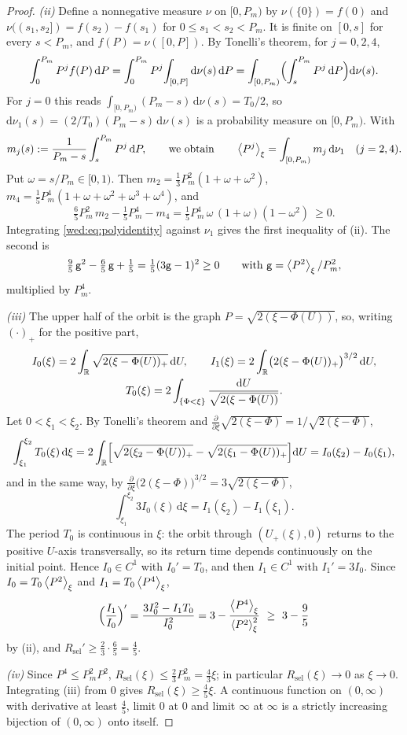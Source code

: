 \begin{proof}
\emph{(ii)} Define a nonnegative measure $\nu$ on $[0,P_m)$ by $\nu(\{0\})=f(0)$ and $\nu((s_1,s_2])=f(s_2)-f(s_1)$ for $0\le s_1<s_2<P_m$. It is finite on $[0,s]$ for every $s<P_m$, and $f(P)=\nu([0,P])$. By Tonelli's theorem, for $j=0,2,4$,
\[
\int_0^{P_m}P^jf(P)\,\mathrm dP=\int_0^{P_m}P^j\!\int_{[0,P]}\mathrm d\nu(s)\,\mathrm dP
=\int_{[0,P_m)}\Bigl(\int_s^{P_m}P^j\,\mathrm dP\Bigr)\mathrm d\nu(s).
\]
For $j=0$ this reads $\int_{[0,P_m)}(P_m-s)\,\mathrm d\nu(s)=T_0/2$, so $\mathrm d\nu_1(s)=(2/T_0)(P_m-s)\,\mathrm d\nu(s)$ is a probability measure on $[0,P_m)$. With
\[
m_j(s):=\frac1{P_m-s}\int_s^{P_m}P^j\,\mathrm dP,\qquad\text{we obtain}\qquad \left\langle P^j\right\rangle_\xi=\int_{[0,P_m)}m_j\,\mathrm d\nu_1\quad(j=2,4).
\]
Put $\omega=s/P_m\in[0,1)$. Then $m_2=\tfrac13P_m^2(1+\omega+\omega^2)$, $m_4=\tfrac15P_m^4(1+\omega+\omega^2+\omega^3+\omega^4)$, and
\begin{equation}\label{wed:eq:polyidentity}
\tfrac65P_m^2\,m_2-\tfrac15P_m^4-m_4=\tfrac15P_m^4\,\omega\,(1+\omega)(1-\omega^2)\ \ge0 .
\end{equation}
Integrating \eqref{wed:eq:polyidentity} against $\nu_1$ gives the first inequality of (ii). The second is
\[
\tfrac95\,\mathsf g^2-\tfrac65\,\mathsf g+\tfrac15=\tfrac15(3\mathsf g-1)^2\ge0\qquad\text{with }\mathsf g=\left\langle P^2\right\rangle_\xi/P_m^2 ,
\]
multiplied by $P_m^4$.

\emph{(iii)} The upper half of the orbit is the graph $P=\sqrt{2(\xi-\Phi(U))}$, so, writing $(\cdot)_+$ for the positive part,
\begin{gather*}
I_0(\xi)=2\int_\mathbb R\sqrt{2(\xi-\Phi(U))_+}\,\mathrm dU,\qquad
I_1(\xi)=2\int_\mathbb R\bigl(2(\xi-\Phi(U))_+\bigr)^{3/2}\,\mathrm dU,\\
T_0(\xi)=2\int_{\{\Phi<\xi\}}\frac{\mathrm dU}{\sqrt{2(\xi-\Phi(U))}} .
\end{gather*}
Let $0<\xi_1<\xi_2$. By Tonelli's theorem and $\tfrac{\partial}{\partial\xi}\sqrt{2(\xi-\Phi)}=1/\sqrt{2(\xi-\Phi)}$,
\[
\int_{\xi_1}^{\xi_2}T_0(\xi)\,\mathrm d\xi
=2\int_\mathbb R\Bigl[\sqrt{2(\xi_2-\Phi(U))_+}-\sqrt{2(\xi_1-\Phi(U))_+}\Bigr]\mathrm dU=I_0(\xi_2)-I_0(\xi_1),
\]
and in the same way, by $\tfrac{\partial}{\partial\xi}\bigl(2(\xi-\Phi)\bigr)^{3/2}=3\sqrt{2(\xi-\Phi)}$,
\[
\int_{\xi_1}^{\xi_2}3I_0(\xi)\,\mathrm d\xi=I_1(\xi_2)-I_1(\xi_1).
\]
The period $T_0$ is continuous in $\xi$: the orbit through $(U_+(\xi),0)$ returns to the positive $U$-axis transversally, so its return time depends continuously on the initial point. Hence $I_0\in C^1$ with $I_0'=T_0$, and then $I_1\in C^1$ with $I_1'=3I_0$. Since $I_0=T_0\left\langle P^2\right\rangle_\xi$ and $I_1=T_0\left\langle P^4\right\rangle_\xi$,
\[
\Bigl(\frac{I_1}{I_0}\Bigr)'=\frac{3I_0^2-I_1T_0}{I_0^2}=3-\frac{\avg{P^4}_\xi}{\avg{P^2}_\xi^2}\ \ge\ 3-\frac95
\]
by (ii), and $R_{\mathrm{sel}}'\ge\tfrac23\cdot\tfrac65=\tfrac45$.

\emph{(iv)} Since $P^4\le P_m^2P^2$, $R_{\mathrm{sel}}(\xi)\le\tfrac23P_m^2=\tfrac43\xi$; in particular $R_{\mathrm{sel}}(\xi)\to0$ as $\xi\to0$. Integrating (iii) from $0$ gives $R_{\mathrm{sel}}(\xi)\ge\tfrac45\xi$. A continuous function on $(0,\infty)$ with derivative at least $\tfrac45$, limit $0$ at $0$ and limit $\infty$ at $\infty$ is a strictly increasing bijection of $(0,\infty)$ onto itself.
\end{proof}

